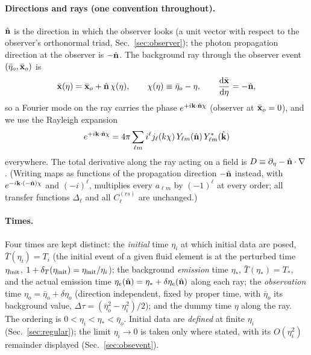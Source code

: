 \paragraph{Directions and rays (one convention throughout).}
$\hat{\mathbf n}$ is the direction in which the observer looks (a unit vector with respect to the observer's
orthonormal triad, Sec.~\ref{sec:observer}); the photon propagation direction at the observer is $-\hat{\mathbf n}$.
The background ray through the observer event $(\bar\eta_o,\bar{\mathbf x}_o)$ is
\begin{equation}
\bar{\mathbf x}(\eta)=\bar{\mathbf x}_o+\hat{\mathbf n}\,\chi(\eta),\qquad \chi(\eta)\equiv\bar\eta_o-\eta,\qquad
\frac{\mathrm d\bar{\mathbf x}}{\mathrm d\eta}=-\hat{\mathbf n},
\label{eq:bgray}
\end{equation}
so a Fourier mode on the ray carries the phase $e^{+i\mathbf k\cdot\hat{\mathbf n}\chi}$ (observer at $\bar{\mathbf x}_o=0$), and we use the Rayleigh expansion
\begin{equation}
e^{+i\mathbf k\cdot\hat{\mathbf n}\chi}=4\pi\sum_{\ell m}i^\ell j_\ell(k\chi)\,Y_{\ell m}(\hat{\mathbf n})\,Y^*_{\ell m}(\hat{\mathbf k})
\label{eq:rayleigh}
\end{equation}
everywhere.  The total derivative along the ray acting on a field is $D\equiv\partial_\eta-\hat{\mathbf n}\cdot\nabla$.  (Writing maps as
functions of the propagation direction $-\hat{\mathbf n}$ instead, with $e^{-i\mathbf k\cdot(-\hat{\mathbf n})\chi}$ and $(-i)^\ell$, multiplies every $a_{\ell m}$ by
$(-1)^\ell$ at every order; all transfer functions $\Delta_\ell$ and all $C^{(rs)}_\ell$ are unchanged.)

\paragraph{Times.}  Four times are kept distinct: the \emph{initial} time $\eta_i$ at which initial data are posed,
$\bar T(\eta_i)=T_i$ (the initial event of a given fluid element is at the perturbed time $\eta_{\rm init}$, $1+\delta_T(\eta_{\rm init})=\eta_{\rm init}/\eta_i$);
the background \emph{emission} time $\eta_*$, $\bar T(\eta_*)=T_*$, and the actual emission time $\eta_e(\hat{\mathbf n})=\eta_*+\delta\eta_e(\hat{\mathbf n})$
along each ray; the \emph{observation} time $\eta_o=\bar\eta_o+\delta\eta_o$ (direction independent, fixed by proper time, with
$\bar\eta_o$ its background value, $\Delta\tau=(\bar\eta_o^2-\eta_i^2)/2$); and the dummy time $\eta$ along the ray.  The ordering is
$0<\eta_i<\eta_*<\bar\eta_o$.  Initial data are \emph{defined} at finite $\eta_i$ (Sec.~\ref{sec:regular}); the limit $\eta_i\to0$ is
taken only where stated, with its $O(\eta_i^2)$ remainder displayed (Sec.~\ref{sec:obsevent}).


